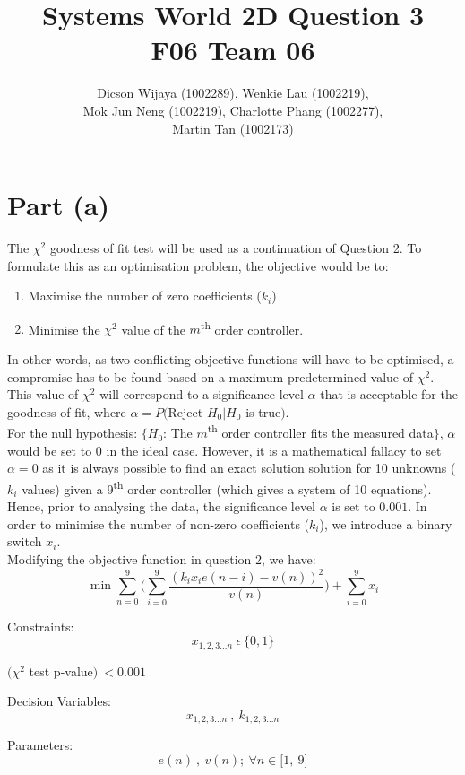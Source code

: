 \documentclass[12pt,a4paper]{article}
\author{Dicson Wijaya (1002289), Wenkie Lau (1002219), \\ Mok Jun Neng (1002219), Charlotte Phang (1002277), \\ Martin Tan (1002173)}
\title{Systems World 2D Question 3\\ F06 Team 06}
\begin{document}
	\maketitle
	\section{Part (a)}
	The $\chi^2$ goodness of fit test will be used as a continuation of Question 2.
	To formulate this as an optimisation problem, the objective would be to:
	\begin{enumerate}
		\item Maximise the number of zero coefficients ($k_i$)
		\item Minimise the $\chi^2$ value of the $m$\textsuperscript{th} order controller.
	\end{enumerate} 
	In other words, as two conflicting objective functions will have to be optimised, a compromise has to be found based on a maximum predetermined value of $\chi^2$. This value of $\chi^2$ will correspond to a significance level $\alpha$ that is acceptable for the goodness of fit, where $\alpha = P($Reject $H_0|H_0$ is true$)$.\\
	
	For the null hypothesis: $\{H_0$: The $m$\textsuperscript{th} order controller fits the measured data$\}$, $\alpha$ would be set to $0$ in the ideal case. However, it is a mathematical fallacy to set $\alpha = 0$ as it is always possible to find an exact solution solution for 10 unknowns ($k_i$ values) given a 9\textsuperscript{th} order controller (which gives a system of 10 equations). Hence, prior to analysing the data, the significance level $\alpha$ is set to $0.001$. In order to minimise the number of non-zero coefficients ($k_i$), we introduce a binary switch $x_i$.\\
	
	Modifying the objective function in question 2, we have: \\
	$$\min \sum_{n=0}^{9} \bigg( \sum_{i=0}^{9} \frac{(k_i x_i e(n-i) - v(n))^2}{v(n)} \bigg) + \sum_{i=0}^{9} x_i$$
	
	Constraints: 
	$$x_{1,2,3...n} \ \epsilon \ \{ 0,1 \}$$
	\begin{center}$(\chi^2$ test p-value$) \ <0.001$\end{center}
	
	Decision Variables: 
	$$x_{1,2,3...n} \ , \ k_{1,2,3...n}$$
	
	Parameters: 
	$$e(n) \ , \ v(n); \ \forall n \in \lbrack 1, \ 9 \rbrack $$
	
\end{document}
